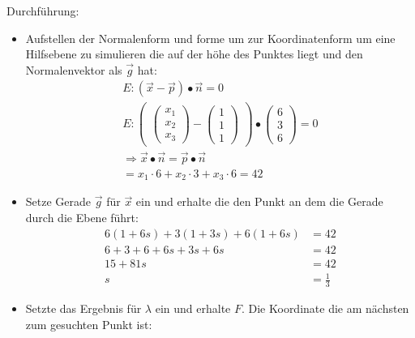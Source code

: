 Durchführung: 
\begin{itemize}

    \item Aufstellen der Normalenform und forme um zur Koordinatenform um eine Hilfsebene zu simulieren die auf der höhe des Punktes liegt und den Normalenvektor als $\vec{g}$ hat: 
        \[
            \begin{gathered}
                E: (\vec{x} - \vec{p}) \bullet \vec{n} = 0 \\
                E: 
                \begin{pmatrix}
                    \begin{pmatrix}
                        x_1 \\ x_2 \\ x_3
                    \end{pmatrix}
                    - 
                    \begin{pmatrix}
                        1 \\ 1 \\ 1
                    \end{pmatrix}
                \end{pmatrix}
                \bullet
                \begin{pmatrix}
                    6 \\ 3 \\ 6
                \end{pmatrix}
                = 0 \\
                \Rightarrow
                \vec{x} \bullet \vec{n} = \vec{p} \bullet \vec{n} \\
                = x_1\cdot 6 + x_2 \cdot 3 + x_3 \cdot 6 = 42
            \end{gathered}
        \]
    \item Setze Gerade $\vec{g}$ für $\vec{x}$ ein und erhalte die den Punkt an dem die Gerade durch die Ebene führt: 
        \[
            \begin{aligned}
                6(1+6s) + 3(1+3s) + 6(1+6s) &= 42  \\
                6 + 3 + 6 + 6s + 3s + 6s &= 42 \\
                15 + 81s &= 42 \\
                s &= \frac{1}{3}
            \end{aligned}
        \]
    \item Setzte das Ergebnis für $\lambda$ ein und erhalte $F$. Die Koordinate die am nächsten zum gesuchten Punkt ist: 

\end{itemize}
